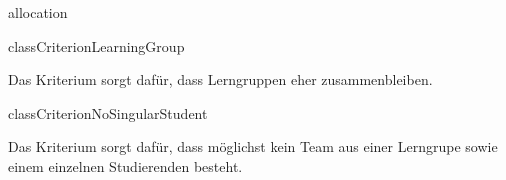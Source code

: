 \begin{texdocpackage}{allocation}
\begin{texdocclass}{class}{CriterionLearningGroup}
\label{texdoclet:allocation.CriterionLearningGroup}
\begin{texdocclassintro}
Das Kriterium sorgt dafür, dass Lerngruppen eher zusammenbleiben.\end{texdocclassintro}
\begin{texdocclassconstructors}
\end{texdocclassconstructors}
\begin{texdocclassmethods}
\end{texdocclassmethods}
\end{texdocclass}


\begin{texdocclass}{class}{CriterionNoSingularStudent}
\label{texdoclet:allocation.CriterionNoSingularStudent}
\begin{texdocclassintro}
Das Kriterium sorgt dafür, dass möglichst kein Team aus einer Lerngrupe sowie
 einem einzelnen Studierenden besteht.\end{texdocclassintro}
\begin{texdocclassconstructors}
\end{texdocclassconstructors}
\begin{texdocclassmethods}
\end{texdocclassmethods}
\end{texdocclass}



\end{texdocpackage}
